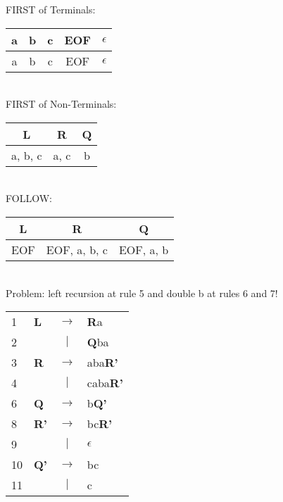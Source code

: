\documentclass[11pt]{article} %
\begin{document}
\noindent FIRST of Terminals: \\

\begin{tabular}{|c|c|c|c|c|} \hline 
\textbf{a}
& \textbf{b}
& \textbf{c}
& \textbf{EOF}
& \textbf{$\epsilon$}\\\hline 

a
& b
& c
& EOF
& $\epsilon$\\\hline  
\end{tabular} \\

\noindent FIRST of Non-Terminals: \\

\begin{tabular}{|c|c|c|} \hline 
\textbf{L}
& \textbf{R}
& \textbf{Q} \\\hline 

a, b, c
& a, c
& b \\\hline  
\end{tabular} \\

\noindent FOLLOW: \\

\begin{tabular}{|c|c|c|} \hline 
\textbf{L}
& \textbf{R}
& \textbf{Q} \\\hline 

EOF
& EOF, a, b, c
& EOF, a, b \\\hline  
\end{tabular} \\

\noindent Problem: left recursion at rule 5 and double b at rules 6 and 7!  \\

\begin{tabular}{llcl}
1
& \textbf{L}
& $\rightarrow$
& \textbf{R}a \\

2
& 
& $\vert$
& \textbf{Q}ba \\

3
& \textbf{R}
& $\rightarrow$
& aba\textbf{R'} \\

4
& 
& $\vert$
& caba\textbf{R'} \\

6
& \textbf{Q}
& $\rightarrow$
& b\textbf{Q'} \\

8
& \textbf{R'}
& $\rightarrow$
& bc\textbf{R'} \\

9
& 
& $\vert$
& $\epsilon$ \\

10
& \textbf{Q'}
& $\rightarrow$
& bc \\

11
& 
& $\vert$
& c \\
\end{tabular} \\
\end{document}
